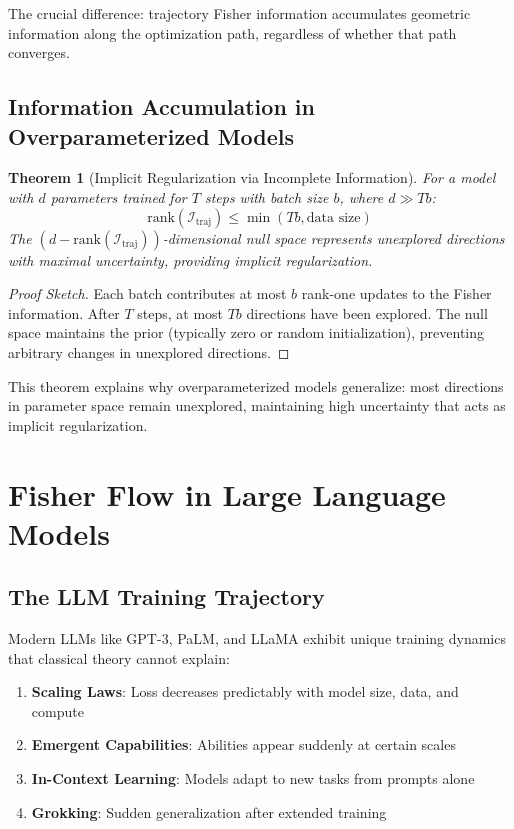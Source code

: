 \documentclass[11pt]{article}
\newtheorem{theorem}{Theorem}
\begin{document}
The crucial difference: trajectory Fisher information accumulates geometric information along the optimization path, regardless of whether that path converges.

\subsection{Information Accumulation in Overparameterized Models}

\begin{theorem}[Implicit Regularization via Incomplete Information]
\label{thm:implicit_reg}
For a model with $d$ parameters trained for $T$ steps with batch size $b$, where $d \gg Tb$:
\begin{equation}
\text{rank}(\mathcal{I}_{\text{traj}}) \leq \min(Tb, \text{data size})
\end{equation}
The $(d - \text{rank}(\mathcal{I}_{\text{traj}}))$-dimensional null space represents unexplored directions with maximal uncertainty, providing implicit regularization.
\end{theorem}

\begin{proof}[Proof Sketch]
Each batch contributes at most $b$ rank-one updates to the Fisher information. After $T$ steps, at most $Tb$ directions have been explored. The null space maintains the prior (typically zero or random initialization), preventing arbitrary changes in unexplored directions.
\end{proof}

This theorem explains why overparameterized models generalize: most directions in parameter space remain unexplored, maintaining high uncertainty that acts as implicit regularization.

\section{Fisher Flow in Large Language Models}

\subsection{The LLM Training Trajectory}

Modern LLMs like GPT-3, PaLM, and LLaMA exhibit unique training dynamics that classical theory cannot explain:

\begin{enumerate}
\item \textbf{Scaling Laws}: Loss decreases predictably with model size, data, and compute
\item \textbf{Emergent Capabilities}: Abilities appear suddenly at certain scales
\item \textbf{In-Context Learning}: Models adapt to new tasks from prompts alone
\item \textbf{Grokking}: Sudden generalization after extended training
\end{enumerate}
\end{document}

